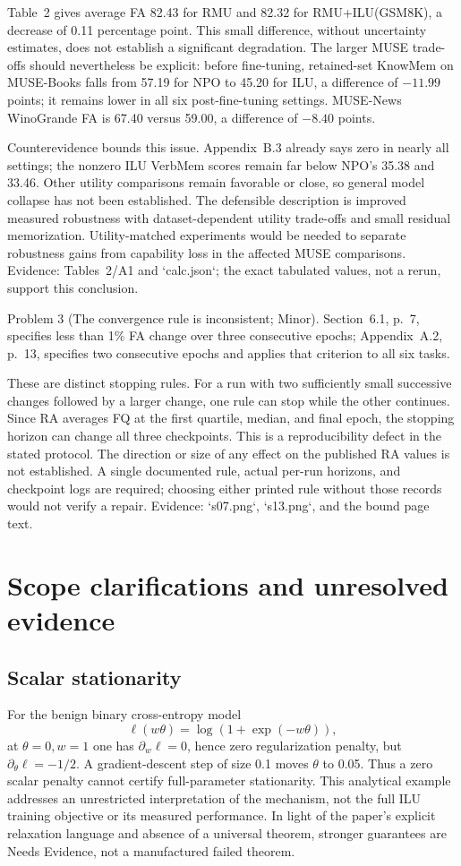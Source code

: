 \documentclass[10pt]{article}
\begin{document}
Table 2 gives average FA 82.43 for RMU and 82.32 for RMU+ILU(GSM8K), a decrease of 0.11 percentage point. This small difference, without uncertainty estimates, does not establish a significant degradation. The larger MUSE trade-offs should nevertheless be explicit: before fine-tuning, retained-set KnowMem on MUSE-Books falls from 57.19 for NPO to 45.20 for ILU, a difference of \(-11.99\) points; it remains lower in all six post-fine-tuning settings. MUSE-News WinoGrande FA is 67.40 versus 59.00, a difference of \(-8.40\) points.\par
Counterevidence bounds this issue. Appendix B.3 already says zero in nearly all settings; the nonzero ILU VerbMem scores remain far below NPO’s 35.38 and 33.46. Other utility comparisons remain favorable or close, so general model collapse has not been established. The defensible description is improved measured robustness with dataset-dependent utility trade-offs and small residual memorization. Utility-matched experiments would be needed to separate robustness gains from capability loss in the affected MUSE comparisons. Evidence: Tables 2/A1 and `calc.json`; the exact tabulated values, not a rerun, support this conclusion.\par
Problem 3 (The convergence rule is inconsistent; Minor).  Section 6.1, p. 7, specifies less than 1\% FA change over three consecutive epochs; Appendix A.2, p. 13, specifies two consecutive epochs and applies that criterion to all six tasks.\par
These are distinct stopping rules. For a run with two sufficiently small successive changes followed by a larger change, one rule can stop while the other continues. Since RA averages FQ at the first quartile, median, and final epoch, the stopping horizon can change all three checkpoints. This is a reproducibility defect in the stated protocol. The direction or size of any effect on the published RA values is not established. A single documented rule, actual per-run horizons, and checkpoint logs are required; choosing either printed rule without those records would not verify a repair. Evidence: `s07.png`, `s13.png`, and the bound page text.\par
\section*{Scope clarifications and unresolved evidence}
\subsection*{Scalar stationarity}
For the benign binary cross-entropy model \[\ell(w\theta)=\log(1+\exp(-w\theta)),\] at \(\theta=0,w=1\) one has \(\partial_w\ell=0\), hence zero regularization penalty, but \(\partial_\theta\ell=-1/2\). A gradient-descent step of size 0.1 moves \(\theta\) to 0.05. Thus a zero scalar penalty cannot certify full-parameter stationarity. This analytical example addresses an unrestricted interpretation of the mechanism, not the full ILU training objective or its measured performance. In light of the paper’s explicit relaxation language and absence of a universal theorem, stronger guarantees are Needs Evidence, not a manufactured failed theorem.\par
\end{document}
